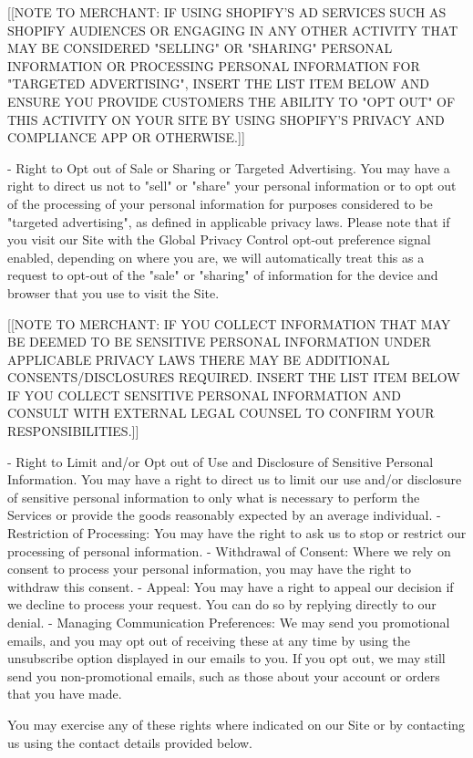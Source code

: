 \documentclass[conference]{IEEEtran}
\begin{document}
[[NOTE TO MERCHANT: IF USING SHOPIFY'S AD SERVICES SUCH AS SHOPIFY AUDIENCES OR ENGAGING IN ANY OTHER ACTIVITY THAT MAY BE CONSIDERED "SELLING" OR "SHARING" PERSONAL INFORMATION OR PROCESSING PERSONAL INFORMATION FOR "TARGETED ADVERTISING", INSERT THE LIST ITEM BELOW AND ENSURE YOU PROVIDE CUSTOMERS THE ABILITY TO "OPT OUT" OF THIS ACTIVITY ON YOUR SITE BY USING SHOPIFY'S PRIVACY AND COMPLIANCE APP OR OTHERWISE.]]

- Right to Opt out of Sale or Sharing or Targeted Advertising. You may have a right to direct us not to "sell" or "share" your personal information or to opt out of the processing of your personal information for purposes considered to be "targeted advertising", as defined in applicable privacy laws. Please note that if you visit our Site with the Global Privacy Control opt-out preference signal enabled, depending on where you are, we will automatically treat this as a request to opt-out of the "sale" or "sharing" of information for the device and browser that you use to visit the Site.

[[NOTE TO MERCHANT: IF YOU COLLECT INFORMATION THAT MAY BE DEEMED TO BE SENSITIVE PERSONAL INFORMATION UNDER APPLICABLE PRIVACY LAWS THERE MAY BE ADDITIONAL CONSENTS/DISCLOSURES REQUIRED. INSERT THE LIST ITEM BELOW IF YOU COLLECT SENSITIVE PERSONAL INFORMATION AND CONSULT WITH EXTERNAL LEGAL COUNSEL TO CONFIRM YOUR RESPONSIBILITIES.]]

- Right to Limit and/or Opt out of Use and Disclosure of Sensitive Personal Information. You may have a right to direct us to limit our use and/or disclosure of sensitive personal information to only what is necessary to perform the Services or provide the goods reasonably expected by an average individual.
- Restriction of Processing: You may have the right to ask us to stop or restrict our processing of personal information.
- Withdrawal of Consent: Where we rely on consent to process your personal information, you may have the right to withdraw this consent.
- Appeal: You may have a right to appeal our decision if we decline to process your request. You can do so by replying directly to our denial.
- Managing Communication Preferences: We may send you promotional emails, and you may opt out of receiving these at any time by using the unsubscribe option displayed in our emails to you. If you opt out, we may still send you non-promotional emails, such as those about your account or orders that you have made.

You may exercise any of these rights where indicated on our Site or by contacting us using the contact details provided below.
\end{document}
